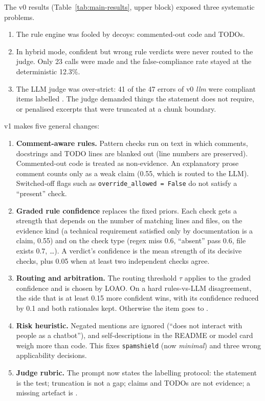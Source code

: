 The v0 results (Table~\ref{tab:main-results}, upper block) exposed three systematic problems.
\begin{enumerate}[leftmargin=*]
  \item The rule engine was fooled by decoys: commented-out code and TODOs.
  \item In hybrid mode, confident but wrong rule verdicts were never routed to the judge. Only 23 calls were made and
        the false-compliance rate stayed at the deterministic 12.3\%.
  \item The LLM judge was over-strict: 41 of the 47 errors of v0 \emph{llm} were compliant items labelled
        . The judge demanded things the statement does not require, or penalised excerpts that were truncated
        at a chunk boundary.
\end{enumerate}
v1 makes five general changes:
\begin{enumerate}[leftmargin=*]
  \item \textbf{Comment-aware rules.} Pattern checks run on text in which comments, docstrings and TODO lines are
        blanked out (line numbers are preserved). Commented-out code is treated as non-evidence. An explanatory prose
        comment counts only as a weak claim (0.55, which is routed to the LLM). Switched-off flags such as
        \texttt{override\_allowed = False} do not satisfy a ``present'' check.
  \item \textbf{Graded rule confidence} replaces the fixed priors. Each check gets a strength that depends on the
        number of matching lines and files, on the evidence kind (a technical requirement satisfied only by
        documentation is a claim, 0.55) and on the check type (regex miss 0.6, ``absent'' pass 0.6, file exists 0.7,
        \dots). A verdict's confidence is the mean strength of its decisive checks, plus 0.05 when at least two
        independent checks agree.
  \item \textbf{Routing and arbitration.} The routing threshold $\tau$ applies to the graded confidence and is chosen
        by LOAO. On a hard rules-vs-LLM disagreement, the side that is at least 0.15 more confident wins, with its
        confidence reduced by 0.1 and both rationales kept. Otherwise the item goes to .
  \item \textbf{Risk heuristic.} Negated mentions are ignored (``does not interact with people as a chatbot''), and
        self-descriptions in the README or model card weigh more than code. This fixes \texttt{spamshield} (now
        \emph{minimal}) and three wrong applicability decisions.
  \item \textbf{Judge rubric.} The prompt now states the labelling protocol: the statement is the test; truncation is
        not a gap; claims and TODOs are not evidence; a missing artefact is .
\end{enumerate}

